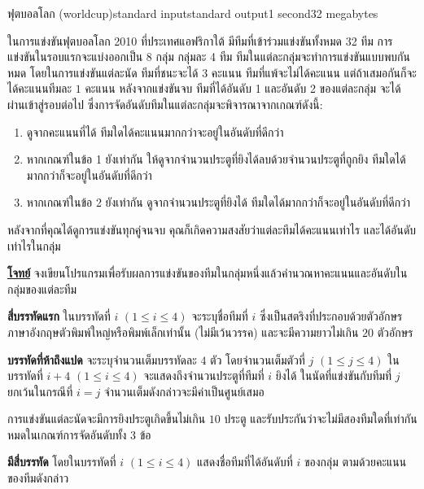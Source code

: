 \documentclass[11pt,a4paper]{article}
\begin{document}
\begin{problem}{ฟุตบอลโลก (worldcup)}{standard input}{standard output}{1 second}{32 megabytes}

ในการแข่งขันฟุตบอลโลก 2010 ที่ประเทศแอฟริกาใต้ มีทีมที่เข้าร่วมแข่งขันทั้งหมด 32 ทีม การแข่งขันในรอบแรกจะแบ่งออกเป็น 8  กลุ่ม กลุ่มละ 4 ทีม ทีมในแต่ละกลุ่มจะทำการแข่งขันแบบพบกันหมด โดยในการแข่งขันแต่ละนัด ทีมที่ชนะจะได้ $3$ คะแนน ทีมที่แพ้จะไม่ได้คะแนน แต่ถ้าเสมอกันก็จะได้คะแนนทีมละ $1$ คะแนน หลังจากแข่งขันจบ ทีมที่ได้อันดับ 1 และอันดับ 2 ของแต่ละกลุ่ม จะได้ผ่านเข้าสู่รอบต่อไป ซึ่งการจัดอันดับทีมในแต่ละกลุ่มจะพิจารณาจากเกณฑ์ดังนี้:

\begin{enumerate}

\item ดูจากคะแนนที่ได้ ทีมใดได้คะแนนมากกว่าจะอยู่ในอันดับที่ดีกว่า
\item หากเกณฑ์ในข้อ 1 ยังเท่ากัน ให้ดูจากจำนวนประตูที่ยิงได้ลบด้วยจำนวนประตูที่ถูกยิง ทีมใดได้มากกว่าก็จะอยู่ในอันดับที่ดีกว่า
\item หากเกณฑ์ในข้อ 2 ยังเท่ากัน ดูจากจำนวนประตูที่ยิงได้ ทีมใดได้มากกว่าก็จะอยู่ในอันดับที่ดีกว่า
\end{enumerate}

หลังจากที่คุณได้ดูการแข่งขันทุกคู่จนจบ คุณก็เกิดความสงสัยว่าแต่ละทีมได้คะแนนเท่าไร และได้อันดับเท่าไรในกลุ่ม

\underline{\textbf{โจทย์}} จงเขียนโปรแกรมเพื่อรับผลการแข่งขันของทีมในกลุ่มหนึ่งแล้วคำนวณหาคะแนนและอันดับในกลุ่มของแต่ละทีม

\InputFile

\textbf{สี่บรรทัดแรก} ในบรรทัดที่ $i$ $(1 \leq i \leq  4)$ จะระบุชื่อทีมที่ $i$ ซึ่งเป็นสตริงที่ประกอบด้วยตัวอักษรภาษาอังกฤษตัวพิมพ์ใหญ่หรือพิมพ์เล็กเท่านั้น (ไม่มีเว้นวรรค) และจะมีความยาวไม่เกิน $20$ ตัวอักษร

\textbf{บรรทัดที่ห้าถึงแปด} จะระบุจำนวนเต็มบรรทัดละ $4$ ตัว โดยจำนวนเต็มตัวที่ $j$ $(1 \leq j \leq 4)$ ในบรรทัดที่ $i+4$ $(1 \leq i \leq 4)$ จะแสดงถึงจำนวนประตูที่ทีมที่ $i$ ยิงได้ ในนัดที่แข่งขันกับทีมที่ $j$ ยกเว้นในกรณีที่ $i = j$ จำนวนเต็มดังกล่าวจะมีค่าเป็นศูนย์เสมอ

การแข่งขันแต่ละนัดจะมีการยิงประตูเกิดขึ้นไม่เกิน $10$ ประตู และรับประกันว่าจะไม่มีสองทีมใดที่เท่ากันหมดในเกณฑ์การจัดอันดับทั้ง 3 ข้อ


\OutputFile

\textbf{มีสี่บรรทัด} โดยในบรรทัดที่ $i$ $(1 \leq i \leq 4)$ แสดงชื่อทีมที่ได้อันดับที่ $i$ ของกลุ่ม ตามด้วยคะแนนของทีมดังกล่าว

\Examples


\end{problem}
\end{document}
